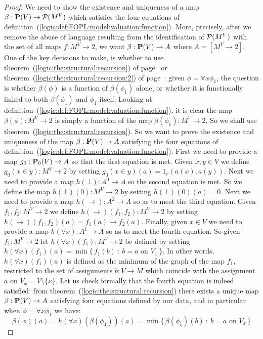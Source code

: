 \begin{proof}
We need to show the existence and uniqueness of a map
$\beta:\mbox{${\bf P}(V)$}\to{\cal P}(M^{V})$ which satisfies the four equations of
definition~(\ref{logic:def:FOPL:model:valuation:function}). More,
precisely, after we remove the abuse of language resulting from the
identification of ${\cal P}(M^{V})$ with the set of all maps
$f:M^{V}\to 2$, we want $\beta:\mbox{${\bf P}(V)$}\to A$ where $A=[M^{V}\to 2]$. One
of the key decisions to make, is whether to use
theorem~(\ref{logic:the:structural:recursion}) of
page~\pageref{logic:the:structural:recursion} or
theorem~(\ref{logic:the:structural:recursion:2}) of
page~\pageref{logic:the:structural:recursion:2}: given $\phi=\forall
x\phi_{1}$, the question is whether $\beta(\phi)$ is a function of
$\beta(\phi_{1})$ alone, or whether it is functionally linked to
both $\beta(\phi_{1})$ and $\phi_{1}$ itself. Looking at
definition~(\ref{logic:def:FOPL:model:valuation:function}), it is
clear the map $\beta(\phi):M^{V}\to 2$ is simply a function of the
map $\beta(\phi_{1}):M^{V}\to 2$. So we shall use
theorem~(\ref{logic:the:structural:recursion}). So we want to prove
the existence and uniqueness of the map $\beta:\mbox{${\bf P}(V)$}\to A$ satisfying
the four equations of
definition~(\ref{logic:def:FOPL:model:valuation:function}). First we
need to provide a map $g_{0}:\mbox{${\bf P}_{0}(V)$}\to A$ so that the first equation
is met. Given $x,y\in V$ we define $g_{0}(x\in y):M^{V}\to 2$ by
setting $g_{0}(x\in y)(a)=1_{r}(a(x),a(y))$. Next we need to provide
a map $h(\bot):A^{0}\to A$ so the second equation is met. So we
define the map $h(\bot)(0):M^{V}\to 2$ by setting $h(\bot)(0)(a)=0$.
Next we need to provide a map $h(\to):A^{2}\to A$ so as to meet the
third equation. Given $f_{1},f_{2}:M^{V}\to 2$ we define
$h(\to)(f_{1},f_{2}):M^{V}\to 2$ by setting
$h(\to)(f_{1},f_{2})(a)=f_{1}(a)\to f_{2}(a)$. Finally, given $x\in
V$ we need to provide a map $h(\forall x):A^{1}\to A$ so as to meet
the fourth equation. So given $f_{1}:M^{V}\to 2$ let $h(\forall
x)(f_{1}):M^{V}\to 2$ be defined by setting $h(\forall
x)(f_{1})(a)=\min\{\,f_{1}(b)\ :\ b=a\mbox{\ on\ }V_{x}\,\}$. In
other words, $h(\forall x)(f_{1})(a)$ is defined as the minimum of
the graph of the map $f_{1}$, restricted to the set of assignments
$b:V\to M$ which coincide with the assignment $a$ on
$V_{x}=V\setminus\{x\}$. Let us check formally that the fourth
equation is indeed satisfied: from
theorem~(\ref{logic:the:structural:recursion}) there exists a unique
map $\beta:\mbox{${\bf P}(V)$}\to A$ satisfying four equations defined by our data,
and in particular when $\phi=\forall x\phi_{1}$ we have:
    \[
    \beta(\phi)(a)=h(\forall x)(\beta(\phi_{1}))(a)
    =\min\{\,\beta(\phi_{1})(b)\ :\ b=a\mbox{\ on\ }V_{x}\,\}
    \]
\end{proof}

